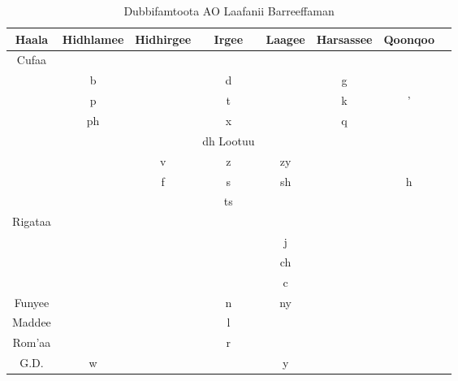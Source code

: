\documentclass[11pt,b5paper]{book}
\begin{document}
\begin{table}[H]	
	\caption{Dubbifamtoota AO Laafanii Barreeffaman}
	\begin{tabular}{c c c c c c c c}
		\hline
		Haala & Hidhlamee & Hidhirgee & Irgee & Laagee & Harsassee & Qoonqoo \\
		\hline
		Cufaa \\
		 & b & & d & & g & & \\
		 & p & & t & & k & ' \\
		 & ph & & x & & q & & \\
		 & & & dh\cr
		\hline
		Lootuu \\
		 & & v & z & zy \\
		 &  & f & s & sh & & h\\
		 & & & ts\\
		\hline
		Rigataa \\
		 & & & & j \\
		 & & & & ch\\
		 & & & & c\\
		\hline
		Funyee & & & n & ny\\
		\hline
		Maddee & & & l\\
		\hline
		Rom'aa & & & r\\
		\hline
		G.D. & w & & & y\\
		\hline		
	\end{tabular}
\end{table}
\end{document}
